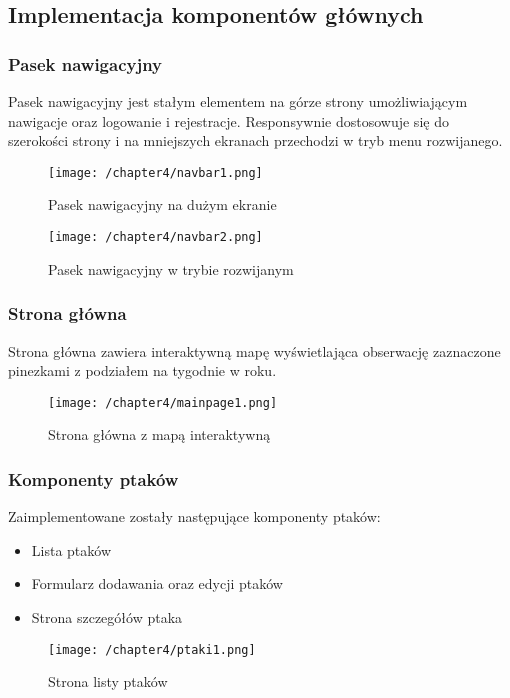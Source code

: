 \subsection{Implementacja komponentów głównych}

\subsubsection{Pasek nawigacyjny}
Pasek nawigacyjny jest stałym elementem na górze strony umożliwiającym nawigacje oraz logowanie i rejestracje. Responsywnie dostosowuje się do szerokości strony i na mniejszych ekranach przechodzi w tryb menu rozwijanego.

\begin{figure}[!htb]
	\centering
	\texttt{[image: /chapter4/navbar1.png]}
	\caption{Pasek nawigacyjny na dużym ekranie}
	\label{fig:navbar1}
\end{figure}

\begin{figure}[!htb]
	\centering
	\texttt{[image: /chapter4/navbar2.png]}
	\caption{Pasek nawigacyjny w trybie rozwijanym}
	\label{fig:navbar2}
\end{figure}

\subsubsection{Strona główna}
Strona główna zawiera interaktywną mapę wyświetlająca obserwację zaznaczone pinezkami z podziałem na tygodnie w roku.

\begin{figure}[!htb]
	\centering
	\texttt{[image: /chapter4/mainpage1.png]}
	\caption{Strona główna z mapą interaktywną}
	\label{fig:mainpage1}
\end{figure}

\subsubsection{Komponenty ptaków}
Zaimplementowane zostały następujące komponenty ptaków:
\begin{itemize}
	\item Lista ptaków
	\item Formularz dodawania oraz edycji ptaków
	\item Strona szczegółów ptaka
\end{itemize}

\begin{figure}[!htb]
	\centering
	\texttt{[image: /chapter4/ptaki1.png]}
	\caption{Strona listy ptaków}
	\label{fig:ptaki1}
\end{figure}

